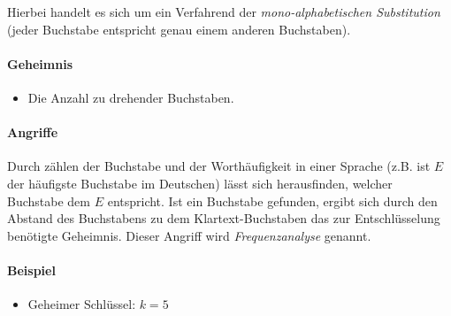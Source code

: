 \documentclass[a4paper, 11pt, accentcolor = tud3b]{tudreport}
\begin{document}
	                    Hierbei handelt es sich um ein Verfahrend der \textit{mono-alphabetischen Substitution} (jeder Buchstabe entspricht genau einem anderen Buchstaben).
                    
                    \paragraph{Geheimnis}
	                    \begin{itemize}
	                    	\item Die Anzahl zu drehender Buchstaben.
	                    \end{itemize}
                    
                    \paragraph{Angriffe}
	                    Durch zählen der Buchstabe und der Worthäufigkeit in einer Sprache (z.B. ist \(E\) der häufigste Buchstabe im Deutschen) lässt sich herausfinden, welcher Buchstabe dem \(E\) entspricht. Ist ein Buchstabe gefunden, ergibt sich durch den Abstand des Buchstabens zu dem Klartext-Buchstaben das zur Entschlüsselung benötigte Geheimnis. Dieser Angriff wird \textit{Frequenzanalyse} genannt.
                    
                    \paragraph{Beispiel}
	                    \begin{itemize}
	                    	\item Geheimer Schlüssel: \tabto{5cm} \( k = 5 \)
	                    \end{itemize}
                    
\end{document}
